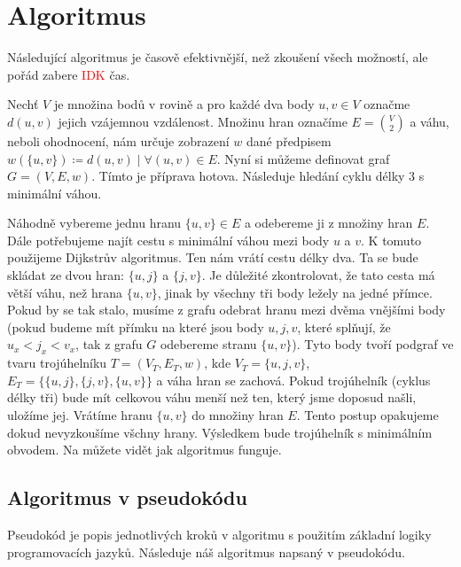 \section{Algoritmus}
\label{sec:algoritmus}
Následující algoritmus je časově efektivnější, než zkoušení všech možností, ale pořád zabere \textcolor{red}{IDK} čas. 

Nechť $V$ je množina bodů v rovině a pro každé dva body $u, v \in V$ označme $d(u, v)$ jejich vzájemnou vzdálenost. Množinu hran označíme $E = \binom{V}{2}$ a váhu, neboli ohodnocení, nám určuje zobrazení $w$ dané předpisem $w(\{u, v\}) \coloneqq d(u, v)\mid \forall (u, v) \in E$. Nyní si můžeme definovat graf $G = (V, E, w)$.
Tímto je příprava hotova. Následuje hledání cyklu délky 3 s minimální váhou.

Náhodně vybereme jednu hranu $\{u, v\} \in E$ a odebereme ji z množiny hran $E$. Dále potřebujeme najít cestu s minimální váhou mezi body $u$ a  $v$. K tomuto použijeme Dijkstrův algoritmus. Ten nám vrátí cestu délky dva. Ta se bude skládat ze dvou hran: $\{u, j\}$ a $\{j, v\}$. Je důležité zkontrolovat, že tato cesta má větší váhu, než hrana $\{u, v\}$, jinak by všechny tři body ležely na jedné přímce.
Pokud by se tak stalo, musíme z grafu odebrat hranu mezi dvěma vnějšími body (pokud budeme mít přímku na které jsou body $u, j, v$, které splňují, že $u_x < j_x < v_x$, tak z grafu $G$ odebereme stranu $\{u, v\}$).
Tyto body tvoří podgraf ve tvaru trojúhelníku $T = (V_T, E_T, w)$, kde $V_T = \{u, j, v\}$, $E_T = \{\{u,j\}, \{j,v\}, \{u,v\}\}$ a váha hran se zachová. Pokud trojúhelník (cyklus délky tři) bude mít celkovou váhu menší než ten, který jsme doposud našli, uložíme jej.
Vrátíme hranu $\{u, v\}$ do množiny hran $E$. Tento postup opakujeme dokud nevyzkoušíme všchny hrany. Výsledkem bude trojúhelník s minimálním obvodem. Na  můžete vidět jak algoritmus funguje.

\subsection{Algoritmus v pseudokódu}
Pseudokód je popis jednotlivých kroků v algoritmu s použitím základní logiky programovacích jazyků. Následuje náš algoritmus napsaný v pseudokódu.


